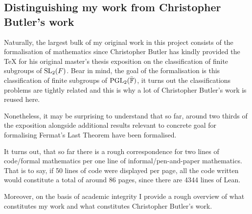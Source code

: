 \subsection{Distinguishing my work from Christopher Butler's work}


Naturally, the largest bulk of my original work in this project consists of the formalisation of mathematics since Christopher Butler has kindly provided the TeX for his original master's thesis exposition on
the classification of finite subgroups of $\operatorname{SL}_2(F)$. Bear in mind, the goal of the formalisation is this classification of finite subgroups of $\operatorname{PGL}_2(\bar{\mathbb{F}})$, it turns out the classifications problems are tightly
related and this is why a lot of Christopher Butler's work is reused here.

Nonetheless, it may be surprising to understand that so far, around two thirds of the exposition alongside additional results relevant to concrete goal for formalising Fermat's Last Theorem have been formalised.

It turns out, that so far there is a rough correspondence for two lines of code/formal mathematics per one line of informal/pen-and-paper mathematics. That is to say, if 50 lines of code were displayed per page, all
the code written would constitute a total of around 86 pages, since there are 4344 lines of Lean.

Moreover, on the basis of academic integrity I provide a rough overview of what constitutes my work and what constitutes Christopher Butler's work.

